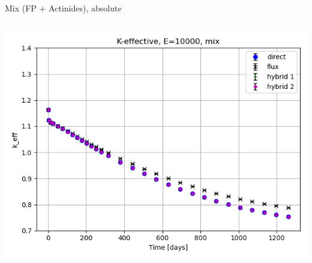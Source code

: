 \documentclass[
	11pt, %
	aspectratio=169, %
]{beamer}
\begin{document}
\begin{frame}{Mix (FP + Actinides), absolute}
\begin{columns}[c]
\begin{column}{0.39\textwidth}
			\includegraphics[width=\textwidth]{../figures/keff/keff_mix_10000.png}
		\end{column}
	\end{columns}
\end{frame}
\end{document}
